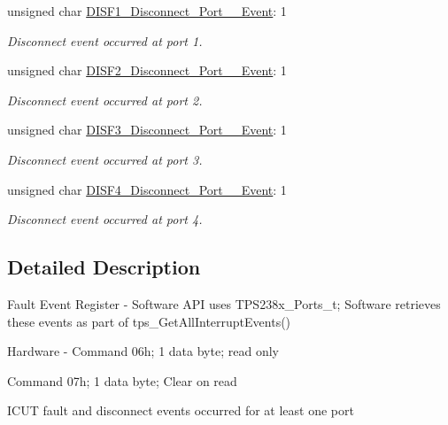 \begin{DoxyCompactItemize}
unsigned char \hyperlink{struct_t_p_s238_x___fault___event___register__t_aeb12eaacf77bd487a6fb5ce92a93d104}{D\-I\-S\-F1\-\_\-\-Disconnect\-\_\-\-Port\-\_\-\_\-\-Event}\-: 1
\begin{DoxyCompactList}\small\item\em Disconnect event occurred at port 1. \end{DoxyCompactList}\item 
unsigned char \hyperlink{struct_t_p_s238_x___fault___event___register__t_a4b0bb76d385415279e0ab54404ed94b3}{D\-I\-S\-F2\-\_\-\-Disconnect\-\_\-\-Port\-\_\-\_\-\-Event}\-: 1
\begin{DoxyCompactList}\small\item\em Disconnect event occurred at port 2. \end{DoxyCompactList}\item 
unsigned char \hyperlink{struct_t_p_s238_x___fault___event___register__t_ad2c936a1c686197d2f4ba88e45abcad8}{D\-I\-S\-F3\-\_\-\-Disconnect\-\_\-\-Port\-\_\-\_\-\-Event}\-: 1
\begin{DoxyCompactList}\small\item\em Disconnect event occurred at port 3. \end{DoxyCompactList}\item 
unsigned char \hyperlink{struct_t_p_s238_x___fault___event___register__t_a5ed7129d3d20f57e4dd303ba222ec4e6}{D\-I\-S\-F4\-\_\-\-Disconnect\-\_\-\-Port\-\_\-\_\-\-Event}\-: 1
\begin{DoxyCompactList}\small\item\em Disconnect event occurred at port 4. \end{DoxyCompactList}\end{DoxyCompactItemize}


\subsection{Detailed Description}
Fault Event Register -\/ Software A\-P\-I uses T\-P\-S238x\-\_\-\-Ports\-\_\-t; Software retrieves these events as part of tps\-\_\-\-Get\-All\-Interrupt\-Events() \par
 Hardware -\/ Command 06h; 1 data byte; read only \par

\begin{DoxyItemize}
\item Command 07h; 1 data byte; Clear on read \par
\par
 I\-C\-U\-T fault and disconnect events occurred for at least one port 
\end{DoxyItemize}

